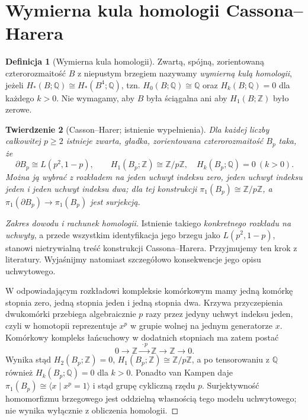 \documentclass[11pt,a4paper]{report}
\numberwithin{equation}{section}
\theoremstyle{plain}
\newtheorem{twierdzenie}{Twierdzenie}[section]
\theoremstyle{definition}
\newtheorem{definicja}[twierdzenie]{Definicja}
\theoremstyle{remark}
\begin{document}
\section{Wymierna kula homologii Cassona--Harera}
\label{sec:tg-rb-rational-ball}

\begin{definicja}[Wymierna kula homologii]
Zwartą, spójną, zorientowaną czterorozmaitość
$B$ z niepustym brzegiem nazywamy
\emph{wymierną kulą homologii}, jeżeli
$H_*(B;\mathbb Q)\cong H_*(B^4;\mathbb Q)$,
tzn. $H_0(B;\mathbb Q)\cong\mathbb Q$ oraz
$H_k(B;\mathbb Q)=0$ dla każdego $k>0$.
Nie wymagamy, aby $B$ była ściągalna ani
aby $H_1(B;\mathbb Z)$ było zerowe.
\end{definicja}

\begin{twierdzenie}[Casson--Harer; istnienie wypełnienia]
\label{thm:tg-rb-casson-harer}
Dla każdej liczby całkowitej $p\geq2$ istnieje
zwarta, gładka, zorientowana czterorozmaitość $B_p$
taka, że
\[
\partial B_p\cong L(p^2,1-p),\qquad
H_1(B_p;\mathbb Z)\cong\mathbb Z/p\mathbb Z,
\quad H_k(B_p;\mathbb Q)=0\ (k>0).
\]
Można ją wybrać z rozkładem na jeden uchwyt
indeksu zero, jeden uchwyt indeksu jeden i jeden
uchwyt indeksu dwa; dla tej konstrukcji
$\pi_1(B_p)\cong\mathbb Z/p\mathbb Z$, a
$\pi_1(\partial B_p)\to\pi_1(B_p)$ jest surjekcją.
\end{twierdzenie}

\begin{proof}[Zakres dowodu i rachunek homologii]
Istnienie takiego \emph{konkretnego rozkładu na uchwyty},
a przede wszystkim identyfikacja jego brzegu jako
$L(p^2,1-p)$, stanowi nietrywialną treść konstrukcji
Cassona--Harera. Przyjmujemy ten krok z literatury.
Wyjaśnijmy natomiast szczegółowo konsekwencje
jego opisu uchwytowego.

W odpowiadającym rozkładowi kompleksie komórkowym
mamy jedną komórkę stopnia zero, jedną stopnia jeden
i jedną stopnia dwa. Krzywa przyczepienia dwukomórki
przebiega algebraicznie $p$ razy przez jedyny
uchwyt indeksu jeden, czyli w homotopii reprezentuje $x^p$
w grupie wolnej na jednym generatorze $x$.
Komórkowy kompleks łańcuchowy w dodatnich stopniach
ma zatem postać
\[
0\longrightarrow\mathbb Z
\xrightarrow{\ \cdot p\ }\mathbb Z
\longrightarrow\mathbb Z\longrightarrow0.
\]
Wynika stąd $H_2(B_p;\mathbb Z)=0$,
$H_1(B_p;\mathbb Z)\cong\mathbb Z/p\mathbb Z$,
a po tensorowaniu z $\mathbb Q$ również
$H_k(B_p;\mathbb Q)=0$ dla $k>0$.
Ponadto van Kampen daje
$\pi_1(B_p)\cong\langle x\mid x^p=1\rangle$
i stąd grupę cykliczną rzędu $p$.
Surjektywność homomorfizmu brzegowego jest
oddzielną własnością tego modelu uchwytowego;
nie wynika wyłącznie z obliczenia homologii.
\end{proof}
\end{document}
